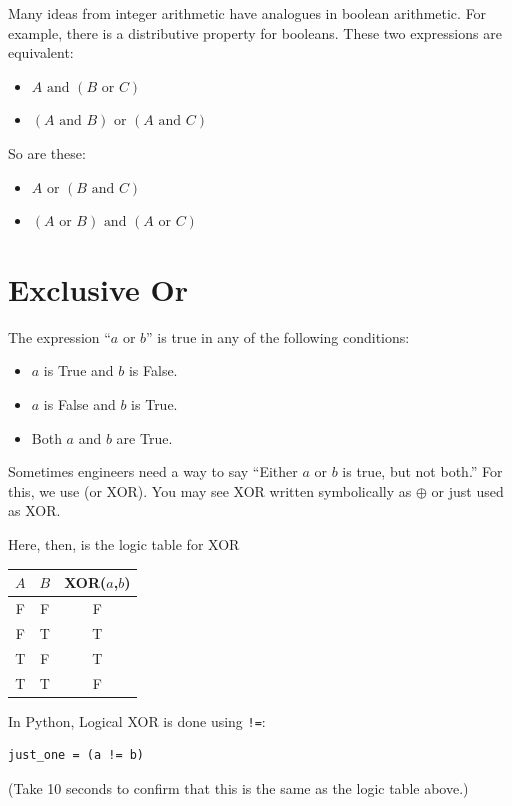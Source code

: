 Many ideas from integer arithmetic have analogues in boolean
arithmetic. For example, there is a distributive property for booleans.  These two expressions are equivalent:
\begin{itemize}
  \item $A \text{ and } \left(B \text{ or } C \right)$
  \item $\left(A \text{ and } B \right) \text{ or } \left( A \text{ and } C \right)$
\end{itemize}

So are these:

\begin{itemize}
  \item $A \text{ or } \left(B \text{ and } C \right)$
  \item $\left(A \text{ or } B \right) \text{ and } \left( A \text{ or } C \right)$
\end{itemize}


\section{Exclusive Or}

The expression ``$a \text{ or } b$'' is true in any of the following conditions:
\begin{itemize}
\item $a$ is True and $b$ is False.
\item $a$ is False and $b$ is True.
\item Both $a$ and $b$ are True.
\end{itemize}

Sometimes engineers need a way to say ``Either $a$ or $b$ is true, but not
both.'' For this, we use  (or XOR). You may see XOR written symbolically as $\oplus$ or just used as XOR. 

Here, then, is the logic table for XOR

\begin{tabular}{c | c | c}
  $A$ & $B$ & XOR($a$,$b$) \\
  \hline
  F & F & F \\
  F & T & T \\
  T & F & T \\
  T & T & F \\
\end{tabular}

In Python, Logical XOR is done using \texttt{!=}:

\begin{verbatim}
just_one = (a != b)
\end{verbatim}

(Take 10 seconds to confirm that this is the same as the logic table
above.)
